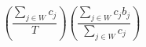 \[ \left( \frac{\sum_{j \in W} c_j}{T} \right) \left(\frac{\sum_{j \in W} c_j b_j}{\sum_{j \in W} c_j} \right) \]